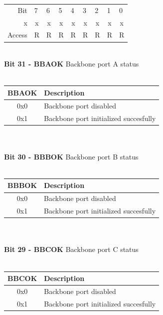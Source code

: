 \begin{table}[h!]
\begin{tabular}{rp{1.25cm}p{1.25cm}p{1.25cm}p{1.25cm}p{1.25cm}p{1.25cm}p{1.25cm}p{1.25cm}}
Bit &
  7 &
  6 &
  5 &
  4 &
  3 &
  2 &
  1 &
  0 \\ \cline{2-9} 

\multicolumn{1}{r|}{x} &
  \multicolumn{1}{c|}{x} &
  \multicolumn{1}{c|}{x} & 
  \multicolumn{1}{c|}{x} &
  \multicolumn{1}{c|}{x} & 
  \multicolumn{1}{c|}{x} & 
  \multicolumn{1}{c|}{x} &
  \multicolumn{1}{c|}{x} &
  \multicolumn{1}{c|}{x} \\\cline{2-9} 
  
Access &
  R &
  R &
  R &
  R &
  R &
  R &
  R &
  R
\end{tabular}
\end{table}\\
\textbf{Bit 31 - BBAOK} Backbone port A status\\\\
\begin{tabular}{|c|l|}
    \hline
   BBAOK & Description\\ \hline
   0x0 & Backbone port disabled\\ \hline
   0x1 & Backbone port initialized succesfully \\ \hline
\end{tabular}\\\\
\textbf{Bit 30 - BBBOK} Backbone port B status\\\\
\begin{tabular}{|c|l|}
    \hline
   BBBOK & Description\\ \hline
   0x0 & Backbone port disabled\\ \hline
   0x1 & Backbone port initialized succesfully \\ \hline
\end{tabular}\\\\
\textbf{Bit 29 - BBCOK} Backbone port C status\\\\
\begin{tabular}{|c|l|}
    \hline
   BBCOK & Description\\ \hline
   0x0 & Backbone port disabled\\ \hline
   0x1 & Backbone port initialized succesfully \\ \hline
\end{tabular}\\\\
